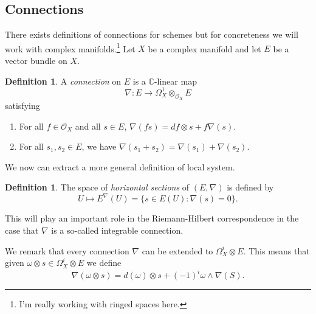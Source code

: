 \documentclass[12pt]{book}
\numberwithin{equation}{section}
\theoremstyle{definition}
\newtheorem{definition}[theorem]{Definition}
\theoremstyle{remark}
\newcommand{\CC}{\mathbb{C}}
\newcommand{\Ocal}{\mathcal{O}}
\begin{document}
\subsection{Connections}
There exists definitions of connections for schemes but for concreteness we will work with complex manifolds.\footnote{I'm really working with ringed spaces here.}
Let $X$ be a complex manifold and let $E$ be a vector bundle on $X$. 
\begin{definition}
	A \emph{connection} on $E$ is a $\CC$-linear map 
	$$ \nabla: E \to \Omega_X^1 \otimes_{\Ocal_X} E $$
	satisfying 
	\begin{enumerate}
		\item For all $f \in \Ocal_X$ and all $s\in E$, $\nabla(fs) = df\otimes s + f\nabla(s).$ 
		\item For all $s_1,s_2 \in E$, we have $\nabla(s_1+s_2)=\nabla(s_1) + \nabla(s_2)$.
	\end{enumerate}
\end{definition}
We now can extract a more general definition of local system.
\begin{definition}
	The space of \emph{horizontal sections} of $(E,\nabla)$ is defined by 
	$$ U \mapsto E^{\nabla}(U) = \lbrace s \in E(U) \colon \nabla(s) =0 \rbrace.$$
\end{definition}
This will play an important role in the Riemann-Hilbert correspondence in the case that $\nabla$ is a so-called integrable connection.

We remark that every connection $\nabla$ can be extended to $\Omega^i_X \otimes E$.
This means that given $\omega \otimes s \in \Omega^i_X \otimes E$ we define
$$ \nabla(\omega \otimes s) = d(\omega) \otimes s + (-1)^i \omega \wedge \nabla(S).$$
\end{document}
